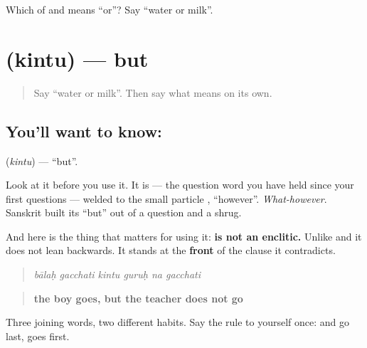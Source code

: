 \begin{tcolorbox}[breakable,colback=teal!4,colframe=teal!35!black,title={Before you move on}]
Which of \textbf{} and \textbf{} means \textquotedblleft{}or\textquotedblright{}? Say \textquotedblleft{}water or milk\textquotedblright{}.
\end{tcolorbox}
\section[\texorpdfstring{\sk{किन्तु} (kintu)}{किन्तु (kintu)}]{ (kintu) — but}

\label{lesson:SA-C52-kintu}



\begin{quote}
Say \textquotedblleft{}water or milk\textquotedblright{}. Then say what \textbf{} means on its own.
\end{quote}

\subsection*{You'll want to know: }
\textbf{} (\emph{kintu}) — \textquotedblleft{}but\textquotedblright{}.

Look at it before you use it. It is \textbf{} — the question word you have held since your first questions — welded to the small particle \textbf{}, \textquotedblleft{}however\textquotedblright{}. \emph{What-however}. Sanskrit built its \textquotedblleft{}but\textquotedblright{} out of a question and a shrug.

And here is the thing that matters for using it: \textbf{ is not an enclitic.} Unlike \textbf{} and \textbf{} it does not lean backwards. It stands at the \textbf{front} of the clause it contradicts.

\begin{quote}
\textbf{     }
\end{quote}

\begin{quote}
\emph{bālaḥ gacchati kintu guruḥ na gacchati}
\end{quote}

\begin{quote}
\textbf{the boy goes, but the teacher does not go}
\end{quote}

Three joining words, two different habits. Say the rule to yourself once: \textbf{} and \textbf{} go last, \textbf{} goes first.

